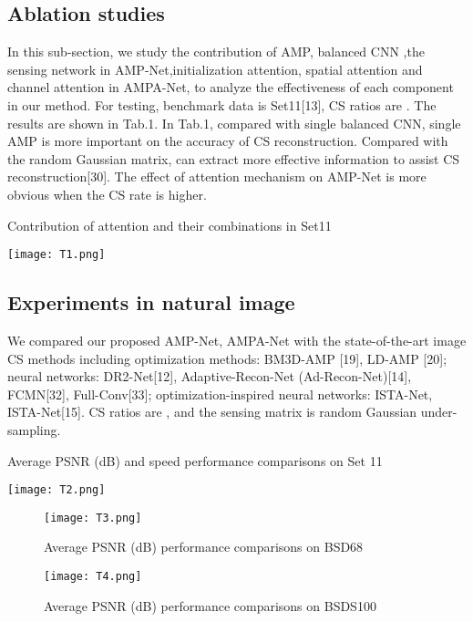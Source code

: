 \documentclass[conference]{IEEEtran}
\begin{document}
\subsection{Ablation studies}
In this sub-section, we study the contribution of AMP, balanced CNN ,the sensing network  in AMP-Net,initialization attention, spatial attention  and channel attention  in AMPA-Net, to analyze the effectiveness of each component in our method.
For testing, benchmark data is Set11[13], CS ratios are . The results are shown in Tab.1. 
In Tab.1, compared with single balanced CNN,  single AMP is more important on the accuracy of CS reconstruction.
Compared with the random Gaussian matrix,   can extract more effective information to assist CS reconstruction[30]. The effect of attention mechanism on AMP-Net is more obvious when the CS rate is higher.
\begin{table}[ht]
\centering
\caption{Contribution of attention and their combinations in Set11}
\texttt{[image: T1.png]}
\label{tab:T1}
\end{table}
\subsection{Experiments in natural image}
We compared our proposed AMP-Net, AMPA-Net with the state-of-the-art image CS methods including optimization methods: BM3D-AMP [19], LD-AMP [20]; neural networks: DR2-Net[12], Adaptive-Recon-Net (Ad-Recon-Net)[14], FCMN[32], Full-Conv[33]; optimization-inspired neural networks: ISTA-Net, ISTA-Net[15].  CS ratios are , and the sensing matrix is random Gaussian under-sampling.
\begin{table}[ht]
\centering
\caption{Average PSNR (dB) and speed performance comparisons on Set 11}
\texttt{[image: T2.png]}
\label{tab:T2}
\end{table}

\begin{figure}[ht]
\centering
\caption{Average PSNR (dB) performance comparisons on BSD68}
\texttt{[image: T3.png]}
\label{tab:T3}
\end{figure}

\begin{figure}[ht]
\centering
\caption{Average PSNR (dB) performance comparisons on BSDS100}
\texttt{[image: T4.png]}
\label{tab:T4}
\end{figure}
\end{document}

